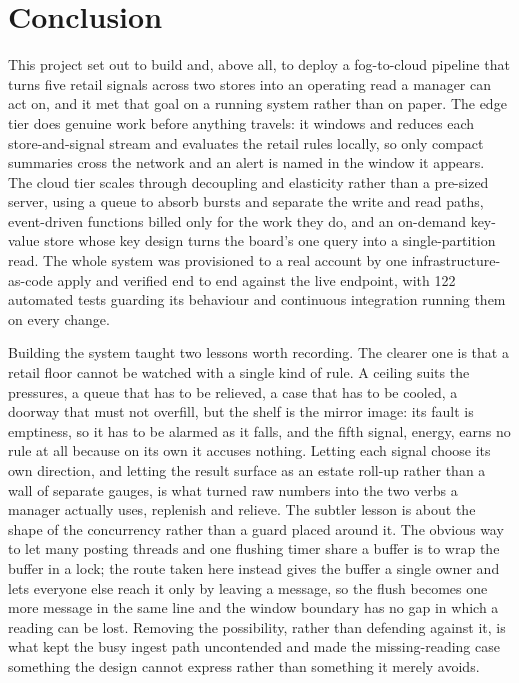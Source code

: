 \documentclass[conference]{IEEEtran}
\begin{document}
\section{Conclusion}

This project set out to build and, above all, to deploy a fog-to-cloud pipeline that turns five retail signals across two stores into an operating read a manager can act on, and it met that goal on a running system rather than on paper. The edge tier does genuine work before anything travels: it windows and reduces each store-and-signal stream and evaluates the retail rules locally, so only compact summaries cross the network and an alert is named in the window it appears. The cloud tier scales through decoupling and elasticity rather than a pre-sized server, using a queue to absorb bursts and separate the write and read paths, event-driven functions billed only for the work they do, and an on-demand key-value store whose key design turns the board's one query into a single-partition read. The whole system was provisioned to a real account by one infrastructure-as-code apply and verified end to end against the live endpoint, with 122 automated tests guarding its behaviour and continuous integration running them on every change.

Building the system taught two lessons worth recording. The clearer one is that a retail floor cannot be watched with a single kind of rule. A ceiling suits the pressures, a queue that has to be relieved, a case that has to be cooled, a doorway that must not overfill, but the shelf is the mirror image: its fault is emptiness, so it has to be alarmed as it falls, and the fifth signal, energy, earns no rule at all because on its own it accuses nothing. Letting each signal choose its own direction, and letting the result surface as an estate roll-up rather than a wall of separate gauges, is what turned raw numbers into the two verbs a manager actually uses, replenish and relieve. The subtler lesson is about the shape of the concurrency rather than a guard placed around it. The obvious way to let many posting threads and one flushing timer share a buffer is to wrap the buffer in a lock; the route taken here instead gives the buffer a single owner and lets everyone else reach it only by leaving a message, so the flush becomes one more message in the same line and the window boundary has no gap in which a reading can be lost. Removing the possibility, rather than defending against it, is what kept the busy ingest path uncontended and made the missing-reading case something the design cannot express rather than something it merely avoids.
\end{document}
